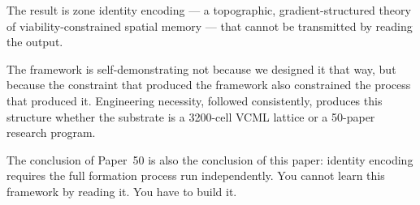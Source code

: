 \documentclass[11pt,a4paper]{article}
\begin{document}
The result is zone identity encoding --- a topographic, gradient-structured
theory of viability-constrained spatial memory --- that cannot be transmitted
by reading the output.

The framework is self-demonstrating not because we designed it that way,
but because the constraint that produced the framework also constrained
the process that produced it.
Engineering necessity, followed consistently, produces this structure
whether the substrate is a 3200-cell VCML lattice or a 50-paper research program.

The conclusion of Paper~50 is also the conclusion of this paper:
identity encoding requires the full formation process run independently.
You cannot learn this framework by reading it.
You have to build it.
\end{document}
